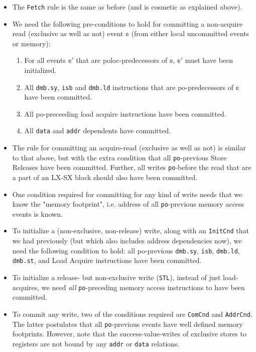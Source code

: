 \documentclass{article}
\newcommand{\var}{\texttt}
\begin{document}
\begin{itemize}
    \setlength\itemsep{0em}
    \item The \texttt{Fetch} rule is the same as before (and is cosmetic as explained above).
    \item We need the following pre-conditions to hold for committing a non-acquire read (exclusive as well as not) event $\mathbb{e}$ (from either local uncommitted events or memory):
        \begin{enumerate}
            \setlength\itemsep{0em}
            \item For all events $\mathbb{e}'$ that are poloc-predecessors of $\mathbb{e}$, $\mathbb{e}'$ must have been initialized.
            \item All \var{dmb.sy}, \var{isb} and \var{dmb.ld} instructions that are po-predecessors of $\mathbb{e}$ have been committed.
            \item All po-preceeding load acquire instructions have been committed.
            \item All \var{data} and \var{addr} dependents have committed.
        \end{enumerate}
    \item The rule for committing an acquire-read (exclusive as well as not) is similar to that above, but with the extra condition that all \var{po}-previous Store Releases have been committed. Further, all writes \var{po}-before the read that are a part of an LX-SX block should also have been committed.
    \item One condition required for committing for any kind of write needs that we know the "memory footprint", i.e. address of all \var{po}-previous memory access events is known.
    \item To initialize a (non-exclusive, non-release) write, along with an \texttt{InitCnd} that we had previously (but which also includes address dependencies now), we need the following condition to hold: all po-previous \var{dmb.sy}, \var{isb}, \var{dmb.ld}, \var{dmb.st}, and Load Acquire instructions have been committed.
    \item To initialize a release- but non-exclusive write (\var{STL}), instead of just load-acquires, we need \textit{all} \var{po}-preceding memory access instructions to have been committed.
    \item To commit any write, two of the conditions required are \var{ComCnd} and \var{AddrCnd}. The latter postulates that all \var{po}-previous events have well defined memory footprints. However, note that the success-value-writes of exclusive stores to registers are not bound by any \var{addr} or \var{data} relations.

\end{itemize}
\end{document}
